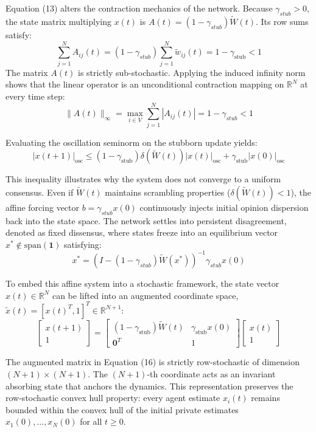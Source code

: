 Equation (13) alters the contraction mechanics of the network\cite{acemoglu2013opinion,hajnal1958weak}. Because $\gamma_{stub} > 0$, the state matrix multiplying $x(t)$ is $A(t) = (1 - \gamma_{stub}) \tilde{W}(t)$\cite{acemoglu2013opinion,hajnal1958weak}. Its row sums satisfy: $$\sum_{j=1}^N A_{ij}(t) = (1 - \gamma_{stub}) \sum_{j=1}^N \tilde{w}_{ij}(t) = 1 - \gamma_{\text{stub}} < 1$$ The matrix $A(t)$ is strictly sub-stochastic\cite{acemoglu2013opinion,hajnal1958weak}. Applying the induced infinity norm shows that the linear operator is an unconditional contraction mapping on $\mathbb{R}^N$ at every time step\cite{acemoglu2013opinion,hajnal1958weak}: $$\|A(t)\|_\infty = \max_{i \in V} \sum_{j=1}^N |A_{ij}(t)| = 1 - \gamma_{stub} < 1$$

Evaluating the oscillation seminorm on the stubborn update yields\cite{hajnal1958weak}: $$|x(t+1)|_{\text{osc}} \le (1 - \gamma_{\text{stub}}) \delta(\tilde{W}(t)) |x(t)|_{\text{osc}} + \gamma_{\text{stub}} |x(0)|_{\text{osc}}$$

This inequality illustrates why the system does not converge to a uniform consensus\cite{acemoglu2013opinion,hajnal1958weak}. Even if $\tilde{W}(t)$ maintains scrambling properties ($\delta(\tilde{W}(t)) < 1$), the affine forcing vector $b = \gamma_{stub} x(0)$ continuously injects initial opinion dispersion back into the state space\cite{acemoglu2013opinion,hajnal1958weak}. The network settles into persistent disagreement, denoted as fixed dissensus, where states freeze into an equilibrium vector $x^* \notin \text{span}(\mathbf{1})$ satisfying\cite{acemoglu2013opinion}: $$x^* = \left( I - (1 - \gamma_{stub}) \tilde{W}(x^*) \right)^{-1} \gamma_{stub} x(0)$$

To embed this affine system into a stochastic framework, the state vector $x(t) \in \mathbb{R}^N$ can be lifted into an augmented coordinate space, $\tilde{x}(t) = [x(t)^T, 1]^T \in \mathbb{R}^{N+1}$\cite{acemoglu2013opinion}: $$\begin{bmatrix} x(t+1) \\ 1 \end{bmatrix} = \begin{bmatrix} (1 - \gamma_{\text{stub}}) \tilde{W}(t) & \gamma_{\text{stub}} x(0) \\ \mathbf{0}^T & 1 \end{bmatrix} \begin{bmatrix} x(t) \\ 1 \end{bmatrix}$$

The augmented matrix in Equation (16) is strictly row-stochastic of dimension $(N+1) \times (N+1)$\cite{acemoglu2013opinion}. The $(N+1)$-th coordinate acts as an invariant absorbing state that anchors the dynamics\cite{acemoglu2013opinion}. This representation preserves the row-stochastic convex hull property: every agent estimate $x_i(t)$ remains bounded within the convex hull of the initial private estimates ${x_1(0), \dots, x_N(0)}$ for all $t \ge 0$\cite{degroot1974reaching,acemoglu2013opinion}.


